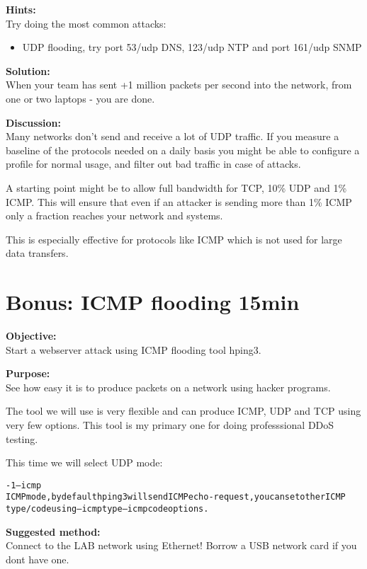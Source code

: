 \documentclass[a4paper,11pt,notitlepage]{report}
\begin{document}
{\bf Hints:}\\

Try doing the most common attacks:
\begin{itemize}
\item UDP flooding, try port 53/udp DNS, 123/udp NTP and port 161/udp SNMP
\end{itemize}

{\bf Solution:}\\
When your team has sent +1 million packets per second into the network, from one or two laptops - you are done.

{\bf Discussion:}\\
Many networks don't send and receive a lot of UDP traffic. If you measure a baseline of the protocols needed on a daily basis you might be able to configure a profile for normal usage, and filter out bad traffic in case of attacks.

A starting point might be to allow full bandwidth for TCP, 10\% UDP and 1\% ICMP. This will ensure that even if an attacker is sending more than 1\% ICMP only a fraction reaches your network and systems.

This is especially effective for protocols like ICMP which is not used for large data transfers.

\chapter{Bonus: ICMP flooding 15min}

{\bf Objective:}\\
Start a webserver attack using ICMP flooding tool hping3.

{\bf Purpose:}\\
See how easy it is to produce packets on a network using hacker programs.

The tool we will use is very flexible and can produce ICMP, UDP and TCP using very few options. This tool is my primary one for doing professsional DDoS testing.

This time we will select UDP mode:

\begin{alltt}\footnotesize
-1 --icmp
       ICMP  mode,  by  default  hping3  will  send  ICMP echo-request, you can set other ICMP
       type/code using --icmptype --icmpcode options.
\end{alltt}

{\bf Suggested method:}\\
Connect to the LAB network using Ethernet! Borrow a USB network card if you dont have one.
\end{document}
